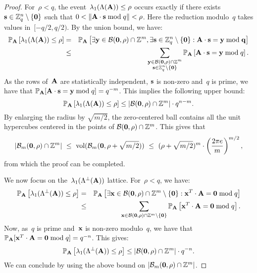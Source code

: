 \begin{proof}
For~$\rho < q$, the event~$\lambda_1(\Lambda({\bf A})) \leq \rho$ occurs exactly if there exists~${\bf s} \in \mZ_q^n \setminus \{\bf 0\}$ 
such that $0 < \|{\bf A} \cdot {\bf s} \bmod q \|< \rho$. Here the reduction modulo~$q$ takes values in~$[-q/2,q/2)$. 
By the union bound, we have:
\begin{eqnarray*}
\Pr_{\bf A} \left[\lambda_1(\Lambda({\bf A})) \leq \rho \right] & = & \Pr_{\bf A} \left[\exists {\bf y} \in \mathcal{B}({\bf 0},\rho) \cap \mZ^m, \exists {\bf s} \in \mZ_q^n \setminus \{\bf 0\}: {\bf A} \cdot {\bf s} = {\bf y} \bmod q \right] \\
&\leq& 
\sum_{\substack{{\bf y} \in \mathcal{B}({\bf 0},\rho) \cap \mZ^m\\ {\bf s} \in \mZ_q^n \setminus \{\bf 0\}}} 
 \Pr_{\bf A} \left[{\bf A} \cdot {\bf s} = {\bf y} \bmod q \right].
\end{eqnarray*}
As the rows of~${\bf A}$ are statistically independent, ${\bf s}$ is non-zero and~$q$ is prime, we have that $\Pr_{\bf A} [{\bf A} \cdot {\bf s} = {\bf y} \bmod q ] = q^{-m}$. This implies the following upper bound:
\[
\Pr_{\bf A} \left[\lambda_1(\Lambda({\bf A})) \leq \rho \right] \leq \left|\mathcal{B}({\bf 0},\rho) \cap \mZ^m\right| \cdot q^{n-m}.
\]
By enlarging the radius by $\sqrt{m/2}$, the zero-centered ball contains all the unit hypercubes centered in the points of $\mathcal{B}({\bf 0},\rho) \cap \mZ^m$. This gives that 
\[
|\mathcal{B}_m({\bf 0}, \rho) \cap \mZ^m| \ \leq  \ \mbox{vol}(\mathcal{B}_m({\bf 0}, \rho +\sqrt{m/2}))
\ \leq \  (\rho +\sqrt{m/2})^m \cdot \left(\frac{2\pi e}{m}\right)^{m/2},
\]
from which the proof can be completed.

We now focus on the~$\lambda_1(\Lambda^{\perp}({\bf A}))$ lattice. For~$\rho < q$, we have:
\begin{eqnarray*}
\Pr_{\bf A} \left[\lambda_1(\Lambda^{\perp}({\bf A})) \leq \rho \right] & = & \Pr_{\bf A} \left[\exists {\bf x} \in \mathcal{B}({\bf 0},\rho) \cap \mZ^m \setminus \{{\bf 0}\}: {\bf x}^T \cdot {\bf A} = {\bf 0} \bmod q \right] \\
&\leq& 
\sum_{{\bf x} \in \mathcal{B}({\bf 0},\rho) \cap \mZ^m \setminus \{\bf 0\}}  \Pr_{\bf A} \left[{\bf x}^T \cdot {\bf A} = {\bf 0} \bmod q \right].
\end{eqnarray*}
Now, as~$q$ is prime and~${\bf x}$ is non-zero modulo~$q$, we have that $ \Pr_{\bf A} [{\bf x}^T \cdot {\bf A} = {\bf 0} \bmod q] = q^{-n}$. This gives:
\[
\Pr_{\bf A} \left[\lambda_1(\Lambda^{\perp}({\bf A})) \leq \rho \right] \leq  \left|\mathcal{B}({\bf 0},\rho) \cap \mZ^m\right| \cdot q^{-n}.
\]
We can conclude by using the above bound on $|\mathcal{B}_m({\bf 0}, \rho) \cap \mZ^m|$.
\end{proof}

